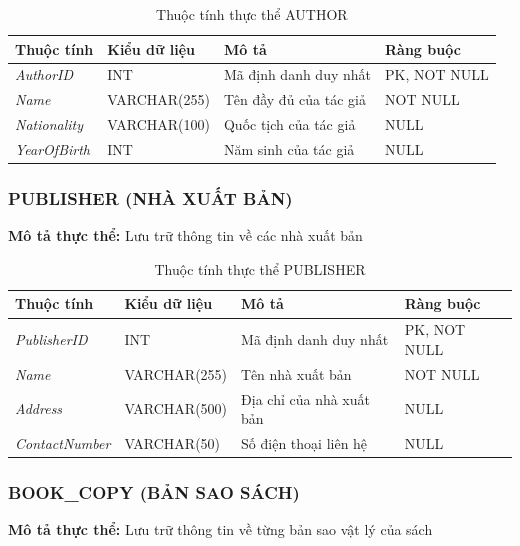 \documentclass[12pt,a4paper]{article}
\newcommand{\attr}[1]{\textit{#1}}
\begin{document}
\begin{table}[H]
\centering
\caption{Thuộc tính thực thể AUTHOR}
\begin{tabular}{@{}|l|l|p{6cm}|l|@{}}
\hline
\textbf{Thuộc tính} & \textbf{Kiểu dữ liệu} & \textbf{Mô tả} & \textbf{Ràng buộc} \\ \hline
\attr{AuthorID} & INT & Mã định danh duy nhất & PK, NOT NULL \\ \hline
\attr{Name} & VARCHAR(255) & Tên đầy đủ của tác giả & NOT NULL \\ \hline
\attr{Nationality} & VARCHAR(100) & Quốc tịch của tác giả & NULL \\ \hline
\attr{YearOfBirth} & INT & Năm sinh của tác giả & NULL \\ \hline
\end{tabular}
\end{table}

\subsubsection{PUBLISHER (NHÀ XUẤT BẢN)}

\textbf{Mô tả thực thể:} Lưu trữ thông tin về các nhà xuất bản

\begin{table}[H]
\centering
\caption{Thuộc tính thực thể PUBLISHER}
\begin{tabular}{@{}|l|l|p{6cm}|l|@{}}
\hline
\textbf{Thuộc tính} & \textbf{Kiểu dữ liệu} & \textbf{Mô tả} & \textbf{Ràng buộc} \\ \hline
\attr{PublisherID} & INT & Mã định danh duy nhất & PK, NOT NULL \\ \hline
\attr{Name} & VARCHAR(255) & Tên nhà xuất bản & NOT NULL \\ \hline
\attr{Address} & VARCHAR(500) & Địa chỉ của nhà xuất bản & NULL \\ \hline
\attr{ContactNumber} & VARCHAR(50) & Số điện thoại liên hệ & NULL \\ \hline
\end{tabular}
\end{table}

\subsubsection{BOOK\_COPY (BẢN SAO SÁCH)}

\textbf{Mô tả thực thể:} Lưu trữ thông tin về từng bản sao vật lý của sách
\end{document}

